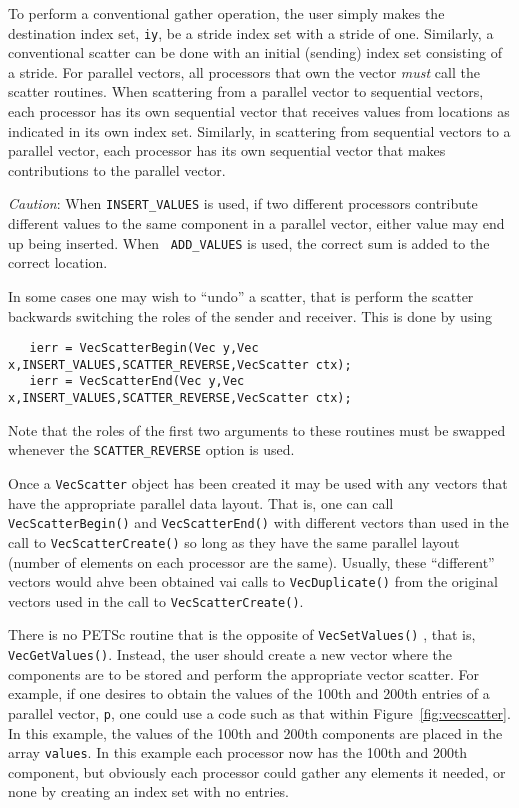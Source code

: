 To perform a conventional gather operation, the user simply makes
 the destination index set, 
{\tt iy}, be a stride index set with a stride of one.  Similarly, a 
conventional scatter can be done with an initial (sending) index set 
consisting of a stride.  For parallel vectors, all processors that own 
the vector {\em must} call the scatter routines. When scattering from a 
parallel vector to sequential vectors, each processor has its own sequential 
vector that receives values from locations as indicated in its own 
index set. Similarly, in scattering
from sequential vectors to a parallel vector, each processor has its
own sequential vector that makes contributions to the parallel vector.

{\em Caution}: When {\tt INSERT\_VALUES} is used, if two different
processors contribute different values to the same component in a
parallel vector, either value may end up being inserted. When {\tt
ADD\_VALUES} is used, the correct sum is added to the correct
location.

In some cases one may wish to ``undo'' a scatter, that is perform the 
scatter backwards switching the roles of the sender and receiver. This is 
done by using 
\begin{verbatim}
   ierr = VecScatterBegin(Vec y,Vec x,INSERT_VALUES,SCATTER_REVERSE,VecScatter ctx);
   ierr = VecScatterEnd(Vec y,Vec x,INSERT_VALUES,SCATTER_REVERSE,VecScatter ctx);
\end{verbatim} 
 Note that the roles of the first 
two arguments to these routines must be swapped whenever the {\tt SCATTER\_REVERSE}
option is used.

Once a {\tt VecScatter} object has been created it may be used with any vectors
that have the appropriate parallel data layout. That is, one can call 
{\tt VecScatterBegin()} and {\tt VecScatterEnd()} with different vectors than 
used in the call to {\tt VecScatterCreate()} so long as they have the same 
parallel layout (number of elements on each processor are the same). Usually,
these ``different'' vectors would ahve been obtained vai calls to 
{\tt VecDuplicate()} from the original vectors used in the call to 
{\tt VecScatterCreate()}.

 
There is no PETSc routine that is the opposite of {\tt VecSetValues()}
, that is, {\tt VecGetValues()}. 
Instead, the user should create a new vector where
the components are to be stored and perform the appropriate vector 
scatter. For example, if one desires to obtain the values of the 
100th and 200th entries of a parallel vector, {\tt p}, one could use 
a code such as that within Figure~\ref{fig:vecscatter}.
In this example, the values of the 100th and 200th components are
placed in the array 
{\tt values}. In this example each processor now has the 100th and 
200th component, but obviously each processor could gather any 
elements it needed, or none by creating an index set with no entries.

